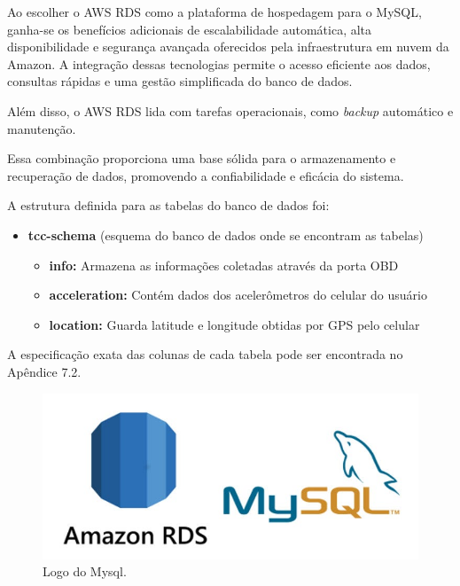      Ao escolher o AWS RDS como a plataforma de hospedagem para o MySQL, ganha-se os benefícios adicionais de escalabilidade automática, alta disponibilidade e segurança avançada oferecidos pela infraestrutura em nuvem da Amazon. A integração dessas tecnologias permite o acesso eficiente aos dados, consultas rápidas e uma gestão simplificada do banco de dados. 
     
     Além disso, o AWS RDS lida com tarefas operacionais, como \textit{backup} automático e manutenção. 
     
     Essa combinação proporciona uma base sólida para o armazenamento e recuperação de dados, promovendo a confiabilidade e eficácia do sistema.

     A estrutura definida para as tabelas do banco de dados foi:


    \begin{itemize}
         \item{\textbf{tcc-schema} (esquema do banco de dados onde se encontram as tabelas)}
         
        \begin{itemize}
             \item{\textbf{info:} Armazena as informações coletadas através da porta OBD} 
        
             \item{\textbf{acceleration:} Contém dados dos acelerômetros do celular do usuário} 
             
             \item{\textbf{location:} Guarda latitude e longitude obtidas por GPS pelo celular}   
        \end{itemize}  
    \end{itemize}

     A especificação exata das colunas de cada tabela pode ser encontrada no Apêndice 7.2.

    \begin{figure}[hp]
        \centering
        
        \includegraphics[scale=0.4]{figures/logo_Mysql.jpg}
        
        \caption{Logo do Mysql.}
        
    \end{figure}

